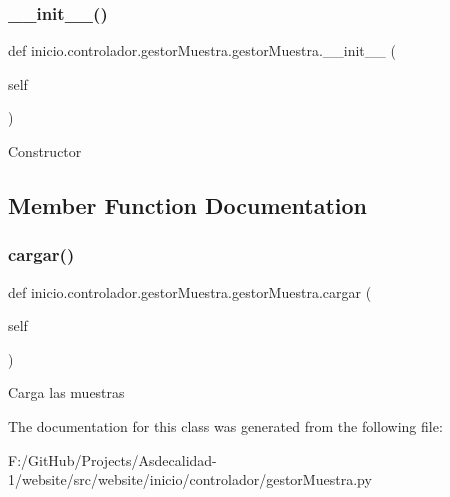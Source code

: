 \subsubsection{\texorpdfstring{\+\_\+\+\_\+init\+\_\+\+\_\+()}{\_\_init\_\_()}}
{\footnotesize\ttfamily def inicio.\+controlador.\+gestor\+Muestra.\+gestor\+Muestra.\+\_\+\+\_\+init\+\_\+\+\_\+ (\begin{DoxyParamCaption}\item[{}]{self }\end{DoxyParamCaption})}

\begin{DoxyVerb}Constructor
\end{DoxyVerb}
 

\subsection{Member Function Documentation}
\mbox{\label{classinicio_1_1controlador_1_1gestor_muestra_1_1gestor_muestra_a85e77a3e43a14f8eceb5d4891aac39a9}} 
\subsubsection{\texorpdfstring{cargar()}{cargar()}}
{\footnotesize\ttfamily def inicio.\+controlador.\+gestor\+Muestra.\+gestor\+Muestra.\+cargar (\begin{DoxyParamCaption}\item[{}]{self }\end{DoxyParamCaption})}

\begin{DoxyVerb}Carga las muestras
\end{DoxyVerb}
 

The documentation for this class was generated from the following file\+:\begin{DoxyCompactItemize}
\item 
F\+:/\+Git\+Hub/\+Projects/\+Asdecalidad-\/1/website/src/website/inicio/controlador/gestor\+Muestra.\+py\end{DoxyCompactItemize}

